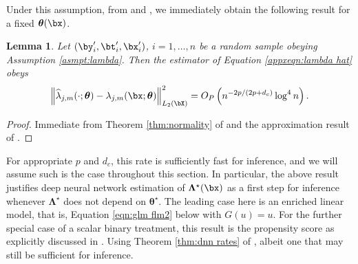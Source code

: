 \documentclass[12pt]{article}
\newtheorem{lemma}{Lemma}
\numberwithin{equation}{section}
\theoremstyle{definition}
\newcommand{\btheta}{\boldsymbol{\theta}}
\newcommand{\bL}{\boldsymbol{\Lambda}}
\newcommand{\bttrue}{\btheta^\star}
\newcommand{\bLtrue}{\bL^\star}
\newcommand{\lhat}{\widehat{\lambda}}
\newcommand{\dc}{d_c}  %
\begin{document}
\begin{appendices}
Under this assumption, from \cite{Farrell-Liang-Misra2021_Ecma} and \cite{Tang2025_WP}, we immediately obtain the following result for a fixed $\btheta(\bx)$.
\begin{lemma}
	\label{appxlem: lambda hat rate 1}
Let $(\by_i', \bt_i', \bx_i')$, $i=1,\ldots, n$ be a random sample obeying Assumption \ref{asmpt:lambda}. Then the estimator of Equation \eqref{appxeqn:lambda hat} obeys
\[
	\left\| \lhat_{j,m}(\cdot; \btheta)  - \lambda_{j,m}(\bx; \btheta) \right\|^2_{L_2(\bX)} = O_P \left( n^{-2p/(2p+\dc)} \log^4 n \right).
\]
\end{lemma}
\begin{proof}
	Immediate from Theorem \ref{thm:normality} of \cite{Farrell-Liang-Misra2021_Ecma} and the approximation result of \cite{Tang2025_WP}. 
\end{proof}
For appropriate $p$ and $\dc$, this rate is sufficiently fast for inference, and we will assume such is the case throughout this section. In particular, the above result justifies deep neural network estimation of $\bLtrue(\bx)$ as a first step for inference whenever $\bLtrue$ does not depend on $\bttrue$. The leading case here is an enriched linear model, that is, Equation \eqref{eqn:glm flm2} below with $G(u) = u$. For the further special case of a scalar binary treatment, this result is the propensity score as explicitly discussed in \cite{Farrell-Liang-Misra2021_Ecma}. Using Theorem \ref{thm:dnn rates} of \cite{Farrell-Liang-Misra2021_Ecma}, albeit one that may still be sufficient for inference.



\end{appendices}
\end{document}
